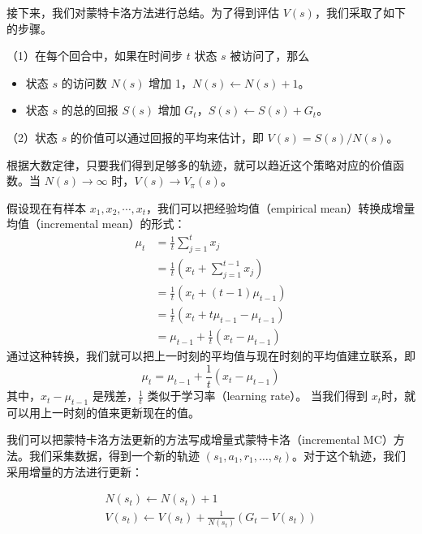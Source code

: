 接下来，我们对蒙特卡洛方法进行总结。为了得到评估 $V(s)$，我们采取了如下的步骤。

	（1）在每个回合中，如果在时间步 $t$ 状态 $s$ 被访问了，那么
	\begin{itemize}
		\item 状态 $s$ 的访问数 $N(s)$ 增加 1，$N(s)\leftarrow N(s)+1$。
		\item 状态 $s$ 的总的回报 $S(s)$  增加 $G_t$，$S(s)\leftarrow S(s)+G_t$。
	\end{itemize}

	（2）状态 $s$ 的价值可以通过回报的平均来估计，即 $V(s)=S(s)/N(s)$。 

	根据大数定律，只要我们得到足够多的轨迹，就可以趋近这个策略对应的价值函数。当 $N(s)\rightarrow \infty$ 时，$V(s) \rightarrow V_{\pi}(s)$。

假设现在有样本 $x_1,x_2,\cdots, x_t$，我们可以把经验均值（empirical mean）转换成增量均值（incremental mean）的形式：
\begin{equation}
	\begin{aligned}
		\mu_{t} &=\frac{1}{t} \sum_{j=1}^{t} x_{j} \\
		&=\frac{1}{t}\left(x_{t}+\sum_{j=1}^{t-1} x_{j}\right) \\
		&=\frac{1}{t}\left(x_{t}+(t-1) \mu_{t-1}\right) \\
		&=\frac{1}{t}\left(x_{t}+t \mu_{t-1}-\mu_{t-1}\right) \\
		&=\mu_{t-1}+\frac{1}{t}\left(x_{t}-\mu_{t-1}\right) 
		\end{aligned}
	\label{eq:}
\end{equation}
通过这种转换，我们就可以把上一时刻的平均值与现在时刻的平均值建立联系，即
\begin{equation}
	\mu_t = \mu_{t-1}+\frac{1}{t}(x_t-\mu_{t-1})
	\label{eq:}
\end{equation}
其中，$x_t- \mu_{t-1}$ 是残差，$\frac{1}{t}$ 类似于学习率（learning rate）。
当我们得到 $x_t$时，就可以用上一时刻的值来更新现在的值。

我们可以把蒙特卡洛方法更新的方法写成增量式蒙特卡洛（incremental MC）方法。我们采集数据，得到一个新的轨迹 $(s_1,a_1,r_1,\dots,s_t)$。对于这个轨迹，我们采用增量的方法进行更新：

\begin{equation}
	\begin{array}{l}
		N\left(s_{t}\right) \leftarrow N\left(s_{t}\right)+1 \\
		V\left(s_{t}\right) \leftarrow V\left(s_{t}\right)+\frac{1}{N\left(s_{t}\right)}\left(G_{t}-V\left(s_{t}\right)\right)
		\end{array}
	\label{eq:}
\end{equation}


